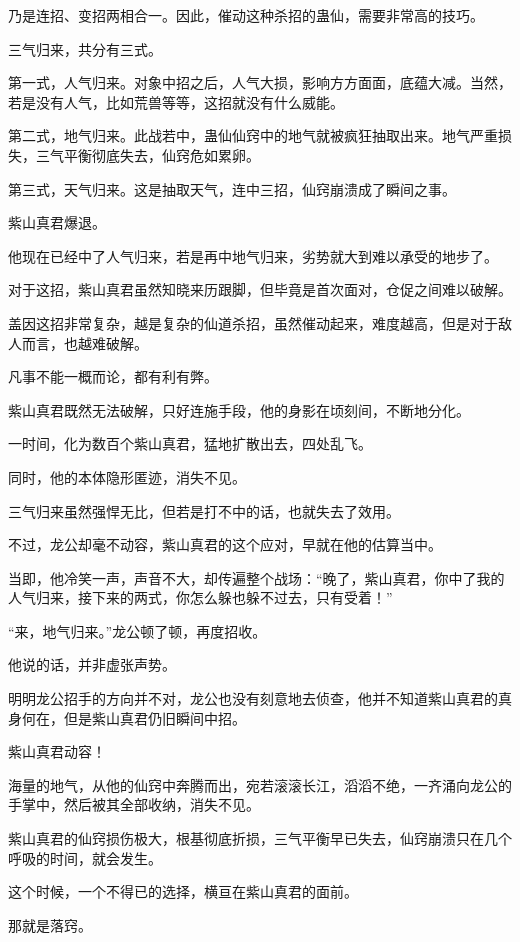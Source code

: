 \begin{this_body}
乃是连招、变招两相合一。因此，催动这种杀招的蛊仙，需要非常高的技巧。

三气归来，共分有三式。

第一式，人气归来。对象中招之后，人气大损，影响方方面面，底蕴大减。当然，若是没有人气，比如荒兽等等，这招就没有什么威能。

第二式，地气归来。此战若中，蛊仙仙窍中的地气就被疯狂抽取出来。地气严重损失，三气平衡彻底失去，仙窍危如累卵。

第三式，天气归来。这是抽取天气，连中三招，仙窍崩溃成了瞬间之事。

紫山真君爆退。

他现在已经中了人气归来，若是再中地气归来，劣势就大到难以承受的地步了。

对于这招，紫山真君虽然知晓来历跟脚，但毕竟是首次面对，仓促之间难以破解。

盖因这招非常复杂，越是复杂的仙道杀招，虽然催动起来，难度越高，但是对于敌人而言，也越难破解。

凡事不能一概而论，都有利有弊。

紫山真君既然无法破解，只好连施手段，他的身影在顷刻间，不断地分化。

一时间，化为数百个紫山真君，猛地扩散出去，四处乱飞。

同时，他的本体隐形匿迹，消失不见。

三气归来虽然强悍无比，但若是打不中的话，也就失去了效用。

不过，龙公却毫不动容，紫山真君的这个应对，早就在他的估算当中。

当即，他冷笑一声，声音不大，却传遍整个战场：“晚了，紫山真君，你中了我的人气归来，接下来的两式，你怎么躲也躲不过去，只有受着！”

“来，地气归来。”龙公顿了顿，再度招收。

他说的话，并非虚张声势。

明明龙公招手的方向并不对，龙公也没有刻意地去侦查，他并不知道紫山真君的真身何在，但是紫山真君仍旧瞬间中招。

紫山真君动容！

海量的地气，从他的仙窍中奔腾而出，宛若滚滚长江，滔滔不绝，一齐涌向龙公的手掌中，然后被其全部收纳，消失不见。

紫山真君的仙窍损伤极大，根基彻底折损，三气平衡早已失去，仙窍崩溃只在几个呼吸的时间，就会发生。

这个时候，一个不得已的选择，横亘在紫山真君的面前。

那就是落窍。


\end{this_body}
